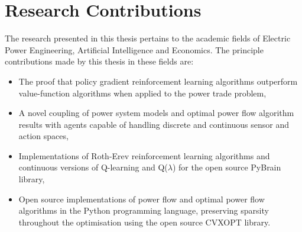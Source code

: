 
%

\section{Research Contributions}
The research presented in this thesis pertains to the academic fields of
Electric Power Engineering, Artificial Intelligence and Economics.  The
principle contributions made by this thesis in these fields are:

\begin{itemize}
  \item The proof that policy gradient reinforcement learning algorithms
  outperform value-function algorithms when applied to the power trade problem,
  \item A novel coupling of power system models and optimal power flow
  algorithm results with agents capable of handling discrete and continuous
  sensor and action spaces,
  \item Implementations of Roth-Erev reinforcement learning algorithms and
  continuous versions of Q-learning and Q($\lambda$) for the open source
  PyBrain library,
  \item Open source implementations of power flow and optimal power flow
  algorithms in the Python programming language, preserving sparsity throughout
  the optimisation using the open source CVXOPT library.
\end{itemize}

